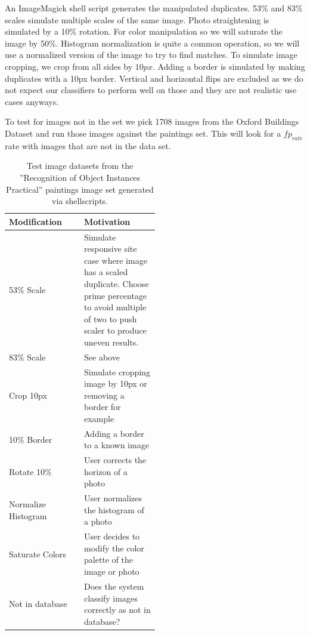 \documentclass[english,12pt,a4paper,pdftex,elec,utf8]{aaltothesis}
\begin{document}
An ImageMagick shell script generates the manipulated duplicates. 53\% and 83\% scales simulate multiple scales of the same image. Photo straightening is simulated by a 10\% rotation. For color manipulation so we will saturate the image by 50\%. Histogram normalization is quite a common operation, so we will use a normalized version of the image to try to find matches. To simulate image cropping, we crop from all sides by $10px$. Adding a border is simulated by making duplicates with a 10px border. Vertical and horizontal flips are excluded as we do not expect our classifiers to perform well on those and they are not realistic use cases anyways.

To test for images not in the set we pick 1708 images from the Oxford Buildings Dataset \cite{PhilbinJamesArandjelovicReljaZisserman2012} and run those images against the paintings set. This will look for a $fp_{rate}$ rate with images that are not in the data set.

\def\arraystretch{1.5}
\begin{table}[htb]
\caption{Test image datasets from the ''Recognition of Object Instances Practical'' \cite{Vedaldi2012} paintings image set generated via shellscripts. }
\label{modifiedimages}
\begin{center}
\begin{tabular}{lp{0.5\linewidth}}
  Modification & Motivation \\
  \hline \hline
  53\% Scale& Simulate responsive site case where image has a scaled duplicate. Choose prime percentage to avoid multiple of two to push scaler to produce uneven results.\\
  \hline
  83\% Scale& See above \\
  \hline
  Crop 10px & Simulate cropping image by 10px or removing a border for example\\
  \hline
  10\% Border & Adding a border to a known image \\
  \hline
  Rotate 10\% & User corrects the horizon of a photo \\
  \hline
  Normalize Histogram & User normalizes the histogram of a photo\\
  \hline
  Saturate Colors & User decides to modify the color palette of the image or photo\\
  \hline
  Not in database & Does the system classify images correctly as not in database?\\
\end{tabular}
\end{center}\end{table}
\end{document}
